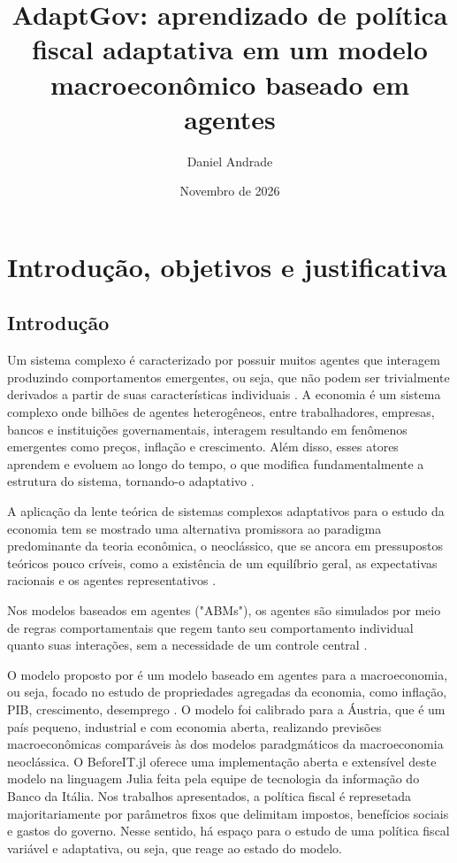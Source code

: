 \documentclass[12pt,a4paper]{article}
\title{AdaptGov: aprendizado de política fiscal adaptativa em um modelo macroeconômico baseado em agentes}
\author{Daniel Andrade}
\date{Novembro de 2026}
\let\cite\citep
\begin{document}
\maketitle
\vspace{-3em}

\section{Introdução, objetivos e justificativa}

\subsection{Introdução}

Um sistema complexo é caracterizado por possuir muitos agentes que interagem produzindo comportamentos emergentes, ou seja, que não podem ser trivialmente derivados a partir de suas características individuais \cite{newman2011}. A economia é um sistema complexo onde bilhões de agentes heterogêneos, entre trabalhadores, empresas, bancos e instituições governamentais, interagem resultando em fenômenos emergentes como preços, inflação e crescimento. Além disso, esses atores aprendem e evoluem ao longo do tempo, o que modifica fundamentalmente a estrutura do sistema, tornando-o adaptativo \cite{arthur2013}.

A aplicação da lente teórica de sistemas complexos adaptativos para o estudo da economia tem se mostrado uma alternativa promissora ao paradigma predominante da teoria econômica, o neoclássico, que se ancora em pressupostos teóricos pouco críveis, como a existência de um equilíbrio geral, as expectativas racionais e os agentes representativos \cite{gallegati2012}.

Nos modelos baseados em agentes ("ABMs"), os agentes são simulados por meio de regras comportamentais que regem tanto seu comportamento individual quanto suas interações, sem a necessidade de um controle central \cite{dawid2018}.

O modelo proposto por \citet{poledna2023} é um modelo baseado em agentes para a macroeconomia, ou seja, focado no estudo de propriedades agregadas da economia, como inflação, PIB, crescimento, desemprego \cite{dawid2018}. O modelo foi calibrado para a Áustria, que é um país pequeno, industrial e com economia aberta, realizando previsões macroeconômicas comparáveis às dos modelos paradgmáticos da macroeconomia neoclássica. O BeforeIT.jl \cite{glielmo2025} oferece uma implementação aberta e extensível deste modelo na linguagem Julia feita pela equipe de tecnologia da informação do Banco da Itália. Nos trabalhos apresentados, a política fiscal é represetada majoritariamente por parâmetros fixos que delimitam impostos, benefícios sociais e gastos do governo. Nesse sentido, há espaço para o estudo de uma política fiscal variável e adaptativa, ou seja, que reage ao estado do modelo.
\end{document}
